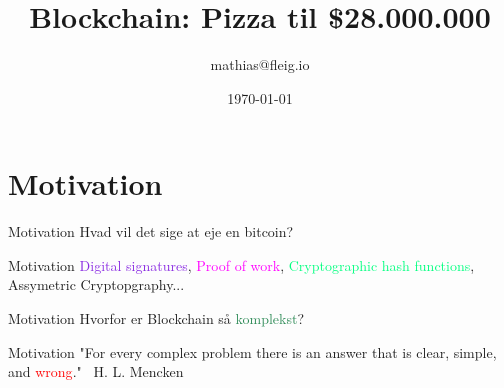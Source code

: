 \documentclass[usenames, dvipsnames]{beamer}
\title{Blockchain: Pizza til \$28.000.000}
\date{\today}
\author{mathias@fleig.io}
\institute{Datalogisk Institut \\ Københavns Universitet}
\begin{document}
  \maketitle
  \section{Motivation}
  \begin{frame}{Motivation}
    \center Hvad vil det sige at \textcolor{BurntOrange}{eje} en bitcoin?
  \end{frame}
  \begin{frame}{Motivation}
      \center \textcolor{BlueViolet}{Digital signatures}, \textcolor{Magenta}{Proof of work}, \center \textcolor{SpringGreen}{Cryptographic hash functions}, \textcolor{Emerald}{Assymetric Cryptopgraphy}...
  \end{frame}
  \begin{frame}{Motivation}
    \center Hvorfor er Blockchain så \textcolor{SeaGreen}{komplekst}?
  \end{frame}
  \begin{frame}{Motivation}
      \center "For every complex problem there is an answer that is clear,
			   simple, and \textcolor{red}{wrong}." \textemdash \ H. L. Mencken
  \end{frame}
\end{document}
